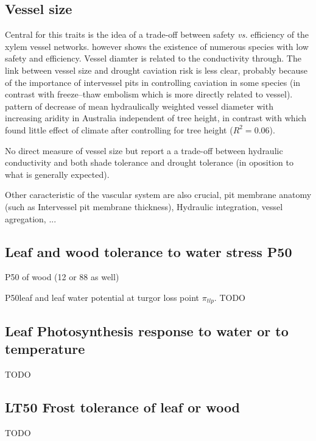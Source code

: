 \documentclass[a4paper,11pt]{article}
\begin{document}
\subsection{Vessel size}

Central for this traits is the idea of a trade-off between safety
\textit{vs.} efficiency of the xylem vessel
networks. \citet{Gleason-2016} however shows the existence of numerous
species with low safety and efficiency. Vessel diamter
is related to the conductivity through. The link between vessel size
and drought caviation risk is less clear, probably because of the
importance of intervessel pits in controlling caviation in some
species (in contrast with freeze–thaw embolism which is more directly
related to vessel).  
\citet{Pfautsch-2016} pattern of decrease of mean hydraulically
weighted vessel diameter with increasing
aridity in Australia independent of tree height, in contrast with
\citet{Olson-2013,Olson-2014} which found little effect of climate after
controlling for tree height ($R^2 = 0.06$).

\citet{Markesteijn-2011} No direct measure of vessel size but report a
a trade-off between hydraulic conductivity and both shade tolerance
and drought tolerance (in oposition to what is generally expected).

Other caracteristic of the vascular system are also crucial, pit
membrane anatomy (such as Intervessel pit membrane thickness), Hydraulic integration, vessel agregation, ...

\subsection{Leaf and wood tolerance to water stress P50}

P50 of wood (12 or 88 as well)

P50leaf \citet{Blackman-2012,Blackman-2014}  and leaf water potential at turgor loss point $\pi_{tlp}$.
TODO

\subsection{Leaf Photosynthesis response to water or to temperature}

TODO

\subsection{LT50 Frost tolerance of leaf or wood}

TODO
\end{document}
